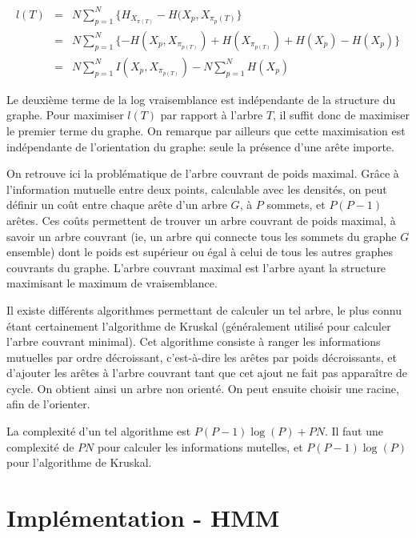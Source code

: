 \documentclass{article}
\begin{document}
\subsection{}

\begin{align}
l(T) & = & N \sum_{p=1}^N \{H_{X_{\pi(T)}} - H(X_p, X_{\pi_p(T)}\} \\
     & = & N \sum_{p=1}^N \{- H(X_p, X_{\pi_{p(T)}}) + H(X_{\pi_{p(T)}}) + H(X_p) - H(X_p)\} \\
     & = & N \sum_{p=1}^N I(X_p, X_{\pi_{p(T)}}) - N \sum_{p=1}^N H(X_p)
\end{align}


Le deuxième terme de la log vraisemblance est indépendante de la structure du
graphe. Pour maximiser $l(T)$ par rapport à l'arbre $T$, il suffit donc de
maximiser le premier terme du graphe. On remarque par ailleurs que cette
maximisation est indépendante de l'orientation du graphe: seule la présence
d'une arête importe.

On retrouve ici la problématique de l'arbre couvrant de poids maximal. Grâce à
l'information mutuelle entre deux points, calculable avec les densités, on peut
définir un coût entre chaque arête d'un arbre $G$, à $P$ sommets, et $P(P - 1)$
arêtes. Ces coûts permettent de trouver un arbre couvrant de poids maximal, à
savoir un arbre couvrant (ie, un arbre qui connecte tous les sommets du graphe
$G$ ensemble) dont le poids est supérieur ou égal à celui de tous les autres
graphes couvrants du graphe. L'arbre couvrant maximal est l'arbre ayant la
structure maximisant le maximum de vraisemblance.

Il existe différents algorithmes permettant de calculer un tel arbre, le plus
connu étant certainement l'algorithme de Kruskal (généralement utilisé pour
calculer l'arbre couvrant minimal). Cet algorithme consiste à ranger les
informations mutuelles par ordre décroissant, c'est-à-dire les arêtes par poids
décroissants, et d'ajouter les arêtes à l'arbre couvrant tant que cet ajout ne
fait pas apparaître de cycle. On obtient ainsi un arbre non orienté. On peut
ensuite choisir une racine, afin de l'orienter.


La complexité d'un tel algorithme est $P(P-1)\log(P) + PN$. Il faut une
complexité de $PN$ pour calculer les informations mutelles, et $P(P-1)\log(P)$
pour l'algorithme de Kruskal.

\section{Implémentation - HMM}
\end{document}
